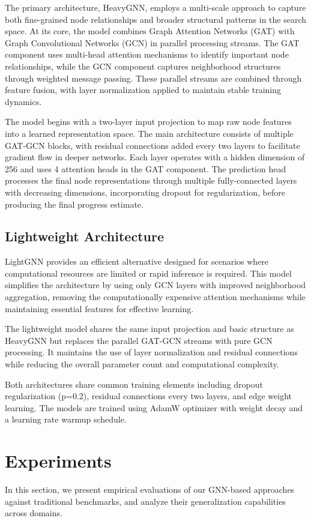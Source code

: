 \documentclass[letterpaper]{article}
\begin{document}
The primary architecture, HeavyGNN, employs a multi-scale approach to capture both fine-grained node relationships and broader structural patterns in the search space. At its core, the model combines Graph Attention Networks (GAT) with Graph Convolutional Networks (GCN) in parallel processing streams. The GAT component uses multi-head attention mechanisms to identify important node relationships, while the GCN component captures neighborhood structures through weighted message passing. These parallel streams are combined through feature fusion, with layer normalization applied to maintain stable training dynamics.

The model begins with a two-layer input projection to map raw node features into a learned representation space. The main architecture consists of multiple GAT-GCN blocks, with residual connections added every two layers to facilitate gradient flow in deeper networks. Each layer operates with a hidden dimension of 256 and uses 4 attention heads in the GAT component. The prediction head processes the final node representations through multiple fully-connected layers with decreasing dimensions, incorporating dropout for regularization, before producing the final progress estimate.

\subsection{Lightweight Architecture}

LightGNN provides an efficient alternative designed for scenarios where computational resources are limited or rapid inference is required. This model simplifies the architecture by using only GCN layers with improved neighborhood aggregation, removing the computationally expensive attention mechanisms while maintaining essential features for effective learning.

The lightweight model shares the same input projection and basic structure as HeavyGNN but replaces the parallel GAT-GCN streams with pure GCN processing. It maintains the use of layer normalization and residual connections while reducing the overall parameter count and computational complexity.

Both architectures share common training elements including dropout regularization (p=0.2), residual connections every two layers, and edge weight learning. The models are trained using AdamW optimizer with weight decay and a learning rate warmup schedule.

\section{Experiments}
In this section, we present empirical evaluations of our GNN-based approaches against traditional benchmarks, and analyze their generalization capabilities across domains.
\end{document}
